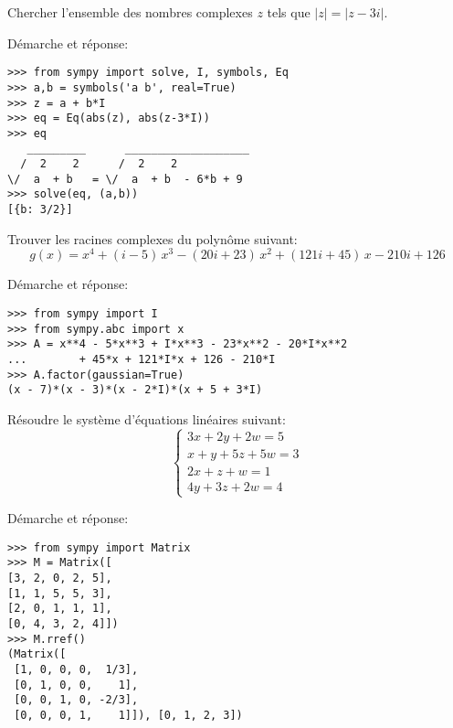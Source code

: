 \begin{question}[1 pts]
    Chercher l'ensemble des nombres complexes $z$ tels que $|z|=|z-3i|$.
\begin{mybox}
Démarche et réponse:
\begin{reponse}
\begin{verbatim}
>>> from sympy import solve, I, symbols, Eq
>>> a,b = symbols('a b', real=True)
>>> z = a + b*I
>>> eq = Eq(abs(z), abs(z-3*I))
>>> eq
   _________      ___________________
  /  2    2      /  2    2
\/  a  + b   = \/  a  + b  - 6*b + 9
>>> solve(eq, (a,b))
[{b: 3/2}]
\end{verbatim}
\end{reponse}
\end{mybox}
\end{question}


\newpage
\begin{question}[1 pts]
Trouver les racines complexes du polynôme suivant:
\[
	g(x) = x^{4} + \left(i - 5\right) \, x^{3} - \left(20 i + 23\right) \, x^{2} +
	\left(121 i + 45\right) \, x - 210 i + 126
    \]
\begin{mybox}
Démarche et réponse:
\begin{reponse}
\begin{verbatim}
>>> from sympy import I
>>> from sympy.abc import x
>>> A = x**4 - 5*x**3 + I*x**3 - 23*x**2 - 20*I*x**2 
...        + 45*x + 121*I*x + 126 - 210*I
>>> A.factor(gaussian=True)
(x - 7)*(x - 3)*(x - 2*I)*(x + 5 + 3*I)
\end{verbatim}
\end{reponse}
\end{mybox}
\end{question}


\begin{question}[2 pts]
Résoudre le système d'équations linéaires suivant:
\[
\left\{
\begin{array}{r}
3x + 2y      + 2w = 5\\
 x +  y + 5z + 5w = 3\\
2x      +  z +  w = 1\\
     4y + 3z + 2w = 4
\end{array}
\right.
\]
\begin{mybox}
Démarche et réponse:
\begin{reponse}
\begin{verbatim}
>>> from sympy import Matrix
>>> M = Matrix([
[3, 2, 0, 2, 5],
[1, 1, 5, 5, 3],
[2, 0, 1, 1, 1],
[0, 4, 3, 2, 4]])
>>> M.rref()
(Matrix([
 [1, 0, 0, 0,  1/3],
 [0, 1, 0, 0,    1],
 [0, 0, 1, 0, -2/3],
 [0, 0, 0, 1,    1]]), [0, 1, 2, 3])
\end{verbatim}
\end{reponse}
\end{mybox}
\end{question}



